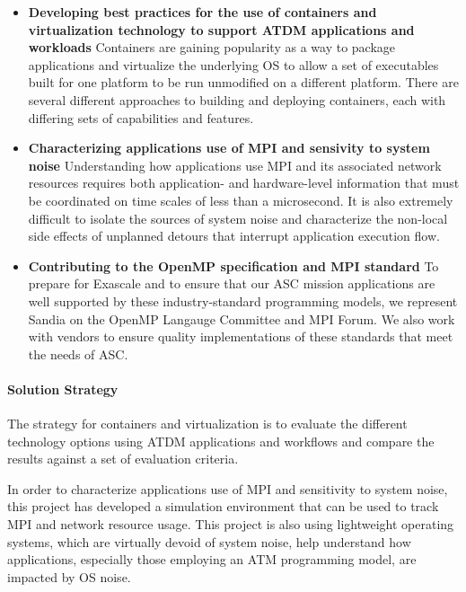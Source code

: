 \begin{itemize}

  \item {\bf Developing best practices for the use of containers and
    virtualization technology to support ATDM applications and
    workloads} Containers are gaining popularity as a way to package
  applications and virtualize the underlying OS to allow a set of
  executables built for one platform to be run unmodified on a
  different platform. There are several different approaches to
  building and deploying containers, each with differing sets of
  capabilities and features.

  \item {\bf Characterizing applications use of MPI and sensivity to
      system noise}  Understanding how applications use MPI and its
    associated  network resources requires both application- and
    hardware-level information that must be coordinated on time scales
    of less than a microsecond. It is also extremely difficult to isolate
    the sources of system noise and characterize the non-local side
    effects of unplanned detours that interrupt application execution
    flow.

  \item {\bf Contributing to the OpenMP specification and MPI standard} 
    To prepare for Exascale and to ensure that our ASC mission applications 
    are well supported by these industry-standard programming models, 
    we represent Sandia on the OpenMP Langauge Committee and MPI Forum.
    We also work with vendors to ensure quality implementations of these
    standards that meet the needs of ASC.

\end{itemize}


\paragraph{Solution Strategy}

The strategy for containers and virtualization is to evaluate the
different technology options using ATDM applications and workflows and
compare the results against a set of evaluation criteria.

In order to characterize applications use of MPI and sensitivity to
system noise, this project has developed a simulation environment that
can be used to track MPI and network resource usage. This project is
also using lightweight operating systems, which are virtually devoid
of system noise, help understand how applications, especially those
employing an ATM programming model, are impacted by OS noise.

